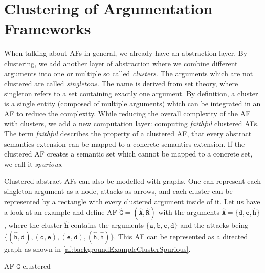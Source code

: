 \section{Clustering of Argumentation Frameworks}
\label{sec:ClusteringOfArgumentationFrameworks}

When talking about AFs in general, we already have an abstraction layer. By clustering, we add another layer of abstraction where we combine different arguments into one or multiple so called \textit{clusters}. The arguments which are not clustered are called \textit{singletons}. The name is derived from set theory, where singleton refers to a set containing exactly one argument.
By definition, a cluster is a single entity (composed of multiple arguments) which can be integrated in an AF to reduce the complexity. While reducing the overall complexity of the AF with clusters, we add a new computation layer: computing \textit{faithful} clustered AFs. The term \textit{faithful} describes the property of a clustered AF, that every abstract semantics extension can be mapped to a concrete semantics extension. If the clustered AF creates a semantic set which cannot be mapped to a concrete set, we call it \textit{spurious}.

Clustered abstract AFs can also be modelled with graphs. One can represent each singleton argument as a node, attacks as arrows, and each cluster can be represented by a rectangle with every clustered argument inside of it. Let us have a look at an example and define AF $\mathtt{\hat{G}=(\hat{A}, \hat{R})}$ with the arguments $\mathtt{\hat{A}=\{d, e, \hat{h}\}}$, where the cluster $\mathtt{\hat{h}}$ contains the arguments $\mathtt{\{a, b, c, d\}}$ and the attacks being $\mathtt{\{(\hat{h}, d), (d, e), (e, d), (\hat{h}, \hat{h})\}}$.  This AF can be represented as a directed graph as shown in \cref{af:backgroundExampleClusterSpurious}.


\begin{example}[h]
    \centering
    \caption{\ac{AF} $\mathtt{\hat{G}}$ clustered}
    \label{af:backgroundExampleClusterSpurious}
\end{example}


